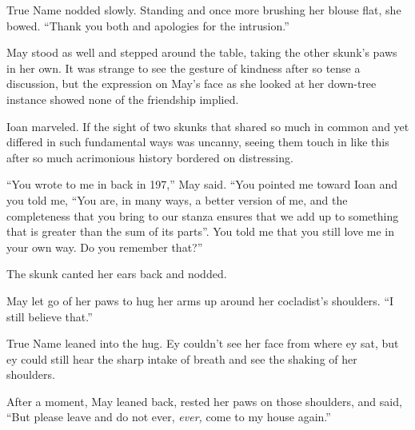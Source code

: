 True Name nodded slowly. Standing and once more brushing her blouse flat, she bowed. ``Thank you both and apologies for the intrusion.''

May stood as well and stepped around the table, taking the other skunk's paws in her own. It was strange to see the gesture of kindness after so tense a discussion, but the expression on May's face as she looked at her down-tree instance showed none of the friendship implied.

Ioan marveled. If the sight of two skunks that shared so much in common and yet differed in such fundamental ways was uncanny, seeing them touch in like this after so much acrimonious history bordered on distressing.

``You wrote to me in back in 197,'' May said. ``You pointed me toward Ioan and you told me, ``You are, in many ways, a better version of me, and the completeness that you bring to our stanza ensures that we add up to something that is greater than the sum of its parts''. You told me that you still love me in your own way. Do you remember that?''

The skunk canted her ears back and nodded.

May let go of her paws to hug her arms up around her cocladist's shoulders. ``I still believe that.''

True Name leaned into the hug. Ey couldn't see her face from where ey sat, but ey could still hear the sharp intake of breath and see the shaking of her shoulders.

After a moment, May leaned back, rested her paws on those shoulders, and said, ``But please leave and do not ever, \emph{ever,} come to my house again.''
